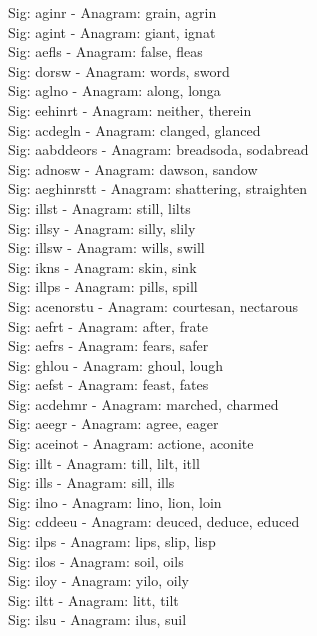 Sig: {aginr} - Anagram: grain, agrin \\
Sig: {agint} - Anagram: giant, ignat \\
Sig: {aefls} - Anagram: false, fleas \\
Sig: {dorsw} - Anagram: words, sword \\
Sig: {aglno} - Anagram: along, longa \\
Sig: {eehinrt} - Anagram: neither, therein \\
Sig: {acdegln} - Anagram: clanged, glanced \\
Sig: {aabddeors} - Anagram: breadsoda, sodabread \\
Sig: {adnosw} - Anagram: dawson, sandow \\
Sig: {aeghinrstt} - Anagram: shattering, straighten \\
Sig: {illst} - Anagram: still, lilts \\
Sig: {illsy} - Anagram: silly, slily \\
Sig: {illsw} - Anagram: wills, swill \\
Sig: {ikns} - Anagram: skin, sink \\
Sig: {illps} - Anagram: pills, spill \\
Sig: {acenorstu} - Anagram: courtesan, nectarous \\
Sig: {aefrt} - Anagram: after, frate \\
Sig: {aefrs} - Anagram: fears, safer \\
Sig: {ghlou} - Anagram: ghoul, lough \\
Sig: {aefst} - Anagram: feast, fates \\
Sig: {acdehmr} - Anagram: marched, charmed \\
Sig: {aeegr} - Anagram: agree, eager \\
Sig: {aceinot} - Anagram: actione, aconite \\
Sig: {illt} - Anagram: till, lilt, itll \\
Sig: {ills} - Anagram: sill, ills \\
Sig: {ilno} - Anagram: lino, lion, loin \\
Sig: {cddeeu} - Anagram: deuced, deduce, educed \\
Sig: {ilps} - Anagram: lips, slip, lisp \\
Sig: {ilos} - Anagram: soil, oils \\
Sig: {iloy} - Anagram: yilo, oily \\
Sig: {iltt} - Anagram: litt, tilt \\
Sig: {ilsu} - Anagram: ilus, suil \\
